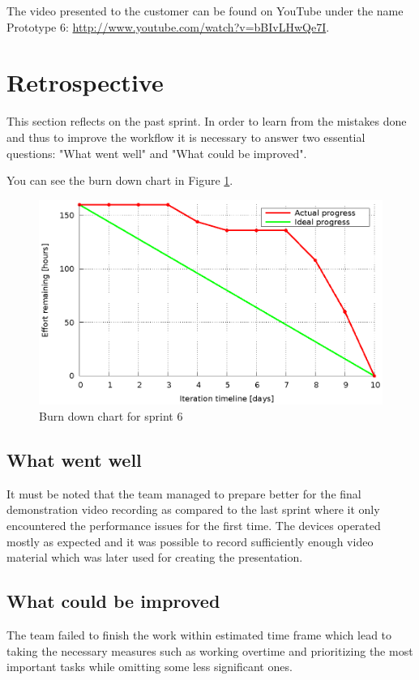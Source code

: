 The video presented to the customer can be found on YouTube under the name Prototype 6: \url{http://www.youtube.com/watch?v=bBIvLHwQe7I}.

\section{Retrospective}
This section reflects on the past sprint. In order to learn from the mistakes done and thus to improve the workflow it is necessary to answer two essential questions: "What went well" and "What could be improved".

You can see the burn down chart in Figure \ref{fig:Burn6}.
\begin{figure}[h]
	\centering
		\includegraphics[width=14cm]{burndowns/sprint6.eps}
	\caption{Burn down chart for sprint 6}
	\label{fig:Burn6}
\end{figure}

\subsection{What went well}
It must be noted that the team managed to prepare better for the final demonstration video recording as compared to the last sprint where it only encountered the performance issues for the first time. The devices operated mostly as expected and it was possible to record sufficiently enough video material which was later used for creating the presentation.

\subsection{What could be improved}
The team failed to finish the work within estimated time frame which lead to taking the necessary measures such as working overtime and prioritizing the most important tasks while omitting some less significant ones.
